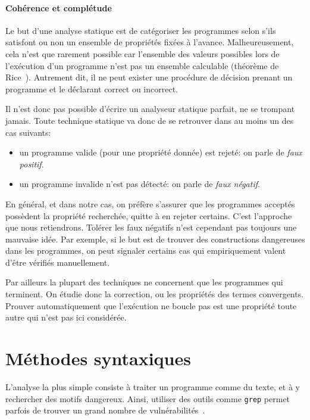 \paragraph{Cohérence et complétude}

Le but d'une analyse statique est de catégoriser les programmes selon s'ils
satisfont ou non un ensemble de propriétés fixées à l'avance. Malheureusement,
cela n'est que rarement possible car l'ensemble des valeurs possibles lors de
l'exécution d'un programme n'est pas un ensemble calculable (théorème de
Rice~\cite{rice}). Autrement dit, il ne peut exister une procédure de décision
prenant un programme et le déclarant correct ou incorrect.

Il n'est donc pas possible d'écrire un analyseur statique parfait, ne se
trompant jamais. Toute technique statique va donc de se retrouver dans au moins
un des cas suivants:

\begin{itemize}
\item
  un programme valide (pour une propriété donnée) est rejeté: on parle de
  \emph{faux positif}.
\item
  un programme invalide n'est pas détecté: on parle de
  \emph{faux négatif}.
\end{itemize}

En général, et dans notre cas, on préfère s'assurer que les programmes acceptés
possèdent la propriété recherchée, quitte à en rejeter certains. C'est
l'approche que nous retiendrons. Tolérer les faux négatifs n'est cependant pas
toujours une mauvaise idée. Par exemple, si le but est de trouver des
constructions dangereuses dans les programmes, on peut signaler certains cas qui
empiriquement valent d'être vérifiés manuellement.

Par ailleurs la plupart des techniques ne concernent que les programmes qui
terminent. On étudie donc la correction, ou les propriétés des termes
convergents. Prouver automatiquement que l'exécution ne boucle pas est une
propriété toute autre qui n'est pas ici considérée.

\section{Méthodes syntaxiques}

L'analyse la plus simple consiste à traiter un programme comme du texte, et à y
rechercher des motifs dangereux. Ainsi, utiliser des outils comme \texttt{grep}
permet parfois de trouver un grand nombre de vulnérabilités~\cite{SpenderGrep}.


